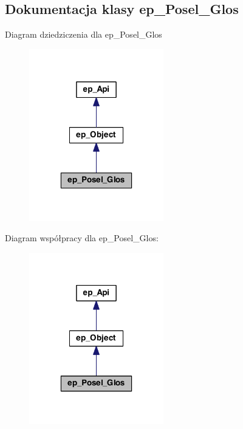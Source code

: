 \hypertarget{classep___posel___glos}{\subsection{Dokumentacja klasy ep\-\_\-\-Posel\-\_\-\-Glos}
\label{classep___posel___glos}
}


Diagram dziedziczenia dla ep\-\_\-\-Posel\-\_\-\-Glos\nopagebreak
\begin{figure}[H]
\begin{center}
\leavevmode
\includegraphics[width=166pt]{classep___posel___glos__inherit__graph}
\end{center}
\end{figure}


Diagram współpracy dla ep\-\_\-\-Posel\-\_\-\-Glos\-:\nopagebreak
\begin{figure}[H]
\begin{center}
\leavevmode
\includegraphics[width=166pt]{classep___posel___glos__coll__graph}
\end{center}
\end{figure}
